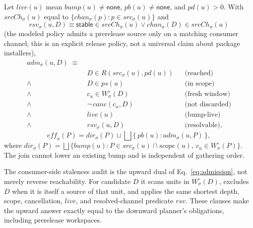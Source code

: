 \begin{definition}
\label{def:adm}
Let $\mathit{live}(u)$ mean $\mathit{bump}(u)\neq\mathsf{none}$,
$\mathit{pb}(u)\neq\mathsf{none}$, and $\mathit{pd}(u)>0$. With
$\mathit{srcCh}_\sigma(u)$ equal to
$\{\mathit{chan}_\sigma(p) : p \in \mathit{src}_\sigma(u)\}$ and
\begin{equation}
  \mathit{rsv}_\sigma(u,D) \equiv \mathsf{stable} \in
  \mathit{srcCh}_\sigma(u) \lor \mathit{chan}_\sigma(D) \in
  \mathit{srcCh}_\sigma(u)
  \label{eq:resolvable}
\end{equation}
(the modeled policy admits a prerelease source only on a matching
consumer channel; this is an explicit release policy, not a universal
claim about package installers),
\begin{equation}
\label{eq:admission}
\begin{aligned}
  \mathit{adm}_\sigma(u,D) \;\equiv\; & \\[-0pt]
     & D \in R(\mathit{src}_\sigma(u), \mathit{pd}(u))
     &\!\!& \text{(reached)} \\
  \wedge\;\; & D \in \mathit{ps}(u)
     &\!\!& \text{(in scope)} \\
  \wedge\;\; & c_u \in W^\circ_\sigma(D)
     &\!\!& \text{(fresh window)} \\
  \wedge\;\; & \neg\,\mathit{canc}(c_u, D)
     &\!\!& \text{(not discarded)} \\
  \wedge\;\; & \mathit{live}(u)
     &\!\!& \text{(bump-live)} \\
  \wedge\;\; & \mathit{rsv}_\sigma(u, D)
     &\!\!& \text{(resolvable),}
\end{aligned}
\end{equation}
\begin{equation}
\label{eq:effective}
  \mathit{eff}_\sigma(P) = \mathit{dir}_\sigma(P) \sqcup
  \bigsqcup \{\, \mathit{pb}(u) : \mathit{adm}_\sigma(u,P) \,\},
\end{equation}
where $\mathit{dir}_\sigma(P) = \bigsqcup\{\mathit{bump}(u) : P \in
\mathit{src}_\sigma(u) \cap \mathit{scope}(u),\ c_u \in W^\circ_\sigma(P)\}$.
The join cannot lower an existing bump and is independent of gathering order.
\end{definition}

The consumer-side staleness audit is the upward dual of
Eq.~\ref{eq:admission}, not merely reverse reachability. For candidate $D$
it scans units in $W^\circ_\sigma(D)$, excludes $D$ when it is itself a
source of that unit, and applies the same shortest depth, scope,
cancellation, $\mathit{live}$, and resolved-channel predicate $\mathit{rsv}$. These clauses
make the upward answer exactly equal to the downward planner's obligations,
including prerelease workspaces.

